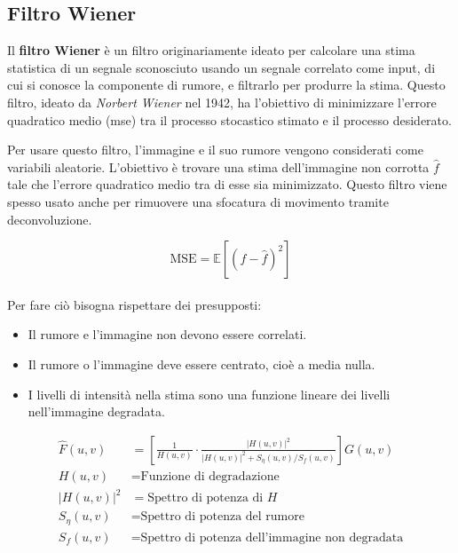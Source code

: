 \documentclass[../main.tex]{subfiles}
\begin{document}
\subsection{Filtro Wiener}

Il \textbf{filtro Wiener} è un filtro originariamente ideato per calcolare una stima statistica di un segnale sconosciuto usando un segnale correlato come input, di cui si conosce la componente di rumore, e filtrarlo per produrre la stima. Questo filtro, ideato da \textit{Norbert Wiener} nel 1942,\cite{wiener_1942} ha l'obiettivo di  minimizzare l'errore quadratico medio (\acrshort{mse}) tra il processo stocastico stimato e il processo desiderato.\cite{oppenheimer_2010}

Per usare questo filtro, l'immagine e il suo rumore vengono considerati come variabili aleatorie. L'obiettivo è trovare una stima dell'immagine non corrotta $\hat{f}$ tale che l'errore quadratico medio tra di esse sia minimizzato. Questo filtro viene spesso usato anche per rimuovere una sfocatura di movimento tramite deconvoluzione. 

\begin{equation}
	\text{MSE} = \mathbb{E}\left[\left(f-\hat{f}\right)^2\right]
\end{equation}
\\[-10pt]
Per fare ciò bisogna rispettare dei presupposti: \cite{bergamasco_2016}

\begin{itemize}
	\itemsep0em
	\item Il rumore e l'immagine non devono essere correlati.
	\item Il rumore o l'immagine deve essere centrato, cioè a media nulla.
	\item I livelli di intensità nella stima sono una funzione lineare dei livelli nell'immagine degradata.
\end{itemize}

\begin{align}
	\hat{F}(u,v) &= \left[\frac{1}{H(u,v)}\cdot\frac{\left|H(u,v)\right|^2}{\left|H(u,v)\right|^2+S_\eta(u,v)/S_f(u,v)}\right]G(u,v)\\[5pt]
	H(u,v) &= \text{Funzione di degradazione} \nonumber \\
	\left|H(u,v)\right|^2 &= \text{Spettro di potenza di } H \nonumber \\
	S_\eta(u,v) &= \text{Spettro di potenza del rumore} \nonumber \\
	S_f(u,v) &= \text{Spettro di potenza dell'immagine non degradata} \nonumber 
\end{align}
\end{document}
